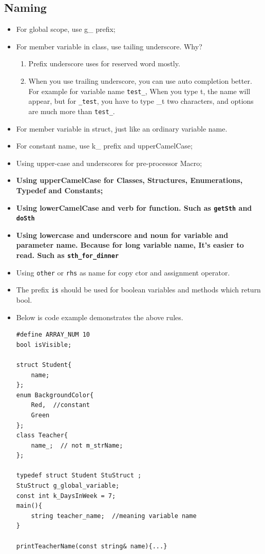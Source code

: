 \documentclass[a4paper,11pt,twoside]{book}
\begin{document}
\subsection{Naming}
\begin{itemize}
	
	\item For global scope, use g\_ prefix;
	
	\item For member variable in class, use tailing underscore. Why? 
	\begin{enumerate}
		\item Prefix underscore uses for reserved word mostly.
		\item When you use trailing underscore, you can use auto completion better. For example for variable name \texttt{test\_}, When you type t, the name will appear, but for \texttt{\_test}, you have to type \_t two characters, and options are much more than \texttt{test\_}.
	\end{enumerate}
	
	\item For member variable in struct, just like an ordinary variable name. 
	
	\item For constant name, use k\_ prefix and upperCamelCase;
	
	\item Using upper-case and underscores for pre-processor Macro;
	
	\item \textbf{Using upperCamelCase for Classes, Structures, Enumerations, Typedef and  Constants;}
	
	\item \textbf{Using lowerCamelCase and verb for function. Such as \texttt{getSth} and \texttt{doSth}}
	
	\item \textbf{Using lowercase and underscore  and noun for variable and parameter name. Because for long variable name, It's easier to read. Such as \texttt{sth\_for\_dinner}}
	
	\item Using \texttt{other} or \texttt{rhs} as name for copy ctor and assignment operator.
	
	\item The prefix \texttt{is} should be used for boolean variables and methods which return bool.
	
	\item Below is code example demonstrates the above rules. 
\begin{lstlisting}[numbers=none]
#define ARRAY_NUM 10
bool isVisible;

struct Student{
	name;
};
enum BackgroundColor{
	Red,  //constant
	Green
};
class Teacher{
	name_;  // not m_strName;  
};

typedef struct Student StuStruct ;
StuStruct g_global_variable;
const int k_DaysInWeek = 7;
main(){
	string teacher_name;  //meaning variable name
}

printTeacherName(const string& name){...}
\end{lstlisting}
\end{itemize}
\end{document}
